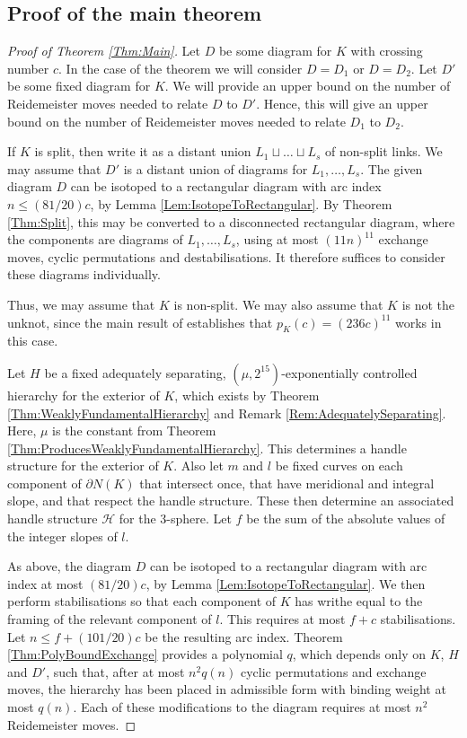 \documentclass[oneside]{amsart}
\numberwithin{equation}{section}
\theoremstyle{plain}
\theoremstyle{definition}
\newcommand{\calH}{\mathcal{H}}
\begin{document}
\subsection{Proof of the main theorem}

\begin{proof}[Proof of Theorem \ref{Thm:Main}]
Let $D$ be some diagram for $K$ with crossing number $c$. In the case of the theorem we will consider $D = D_1$ or $D = D_2$.
Let $D'$ be some fixed diagram for $K$. We will provide an upper bound on the number of Reidemeister
moves needed to relate $D$ to $D'$. Hence, this will give an upper bound on the number of Reidemeister
moves needed to relate $D_1$ to $D_2$.

If $K$ is split, then write it as a distant union $L_1 \sqcup \dots \sqcup L_s$ of non-split links.
We may assume that $D'$ is a distant union of diagrams for $L_1, \dots, L_s$.
The given diagram $D$ can be isotoped to a rectangular diagram with arc index $n \leq (81/20)c$,
by Lemma \ref{Lem:IsotopeToRectangular}. By Theorem \ref{Thm:Split}, this may be
converted to a disconnected rectangular diagram, where the components are diagrams of $L_1, \dots, L_s$,
using at most $(11n)^{11}$ exchange moves, cyclic permutations and destabilisations.
It therefore suffices to consider these diagrams individually.

Thus, we may assume that $K$ is non-split. We may also assume that $K$ is not the unknot,
since the main result of \cite{Lackenby:PolyUnknot} establishes that $p_K(c) = (236c)^{11}$ works in this case.

Let $H$ be a fixed adequately separating, $(\mu,2^{15})$-exponentially controlled hierarchy for the exterior of $K$, 
which exists by Theorem \ref{Thm:WeaklyFundamentalHierarchy} and Remark \ref{Rem:AdequatelySeparating}.
Here, $\mu$ is the constant from Theorem \ref{Thm:ProducesWeaklyFundamentalHierarchy}. This determines a handle structure for
the exterior of $K$. Also let $m$ and $l$ be fixed curves on each component of $\partial N(K)$ that intersect once,
that have meridional and integral slope, and that respect the handle structure. These then
determine an associated handle structure $\calH$ for the 3-sphere. Let $f$ be the sum of the
absolute values of the integer slopes of $l$.

As above, the diagram $D$ can be isotoped to a rectangular diagram with arc index at most $(81/20)c$,
by Lemma \ref{Lem:IsotopeToRectangular}. We then perform stabilisations so that each component
of $K$ has writhe equal to the framing of the relevant component of $l$. This requires at most
$f+c$ stabilisations. Let $n \leq f + (101/20)c$ be the resulting arc index.
Theorem \ref{Thm:PolyBoundExchange} provides a polynomial $q$, which depends only on $K$, $H$ and $D'$, 
such that, after at most $n^2 q(n)$ cyclic permutations and exchange moves,
the hierarchy has been placed in admissible form with binding weight at most $q(n)$.
Each of these modifications to the diagram requires at most $n^2$ Reidemeister moves.


\end{proof}
\end{document}
